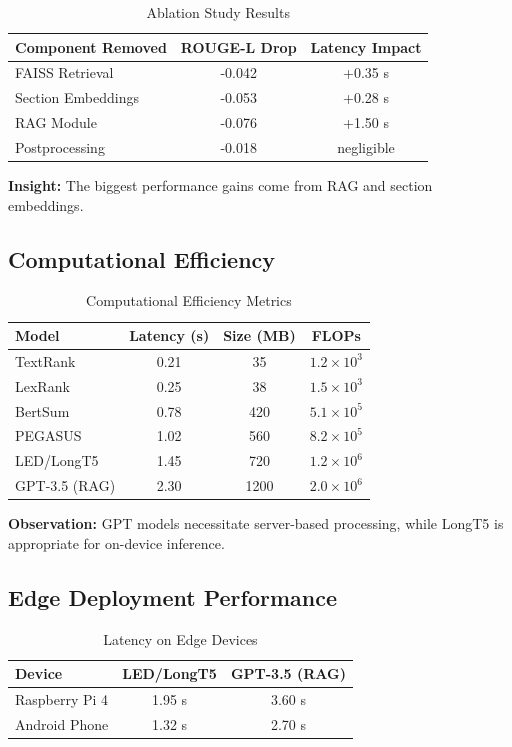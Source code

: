 \documentclass[conference]{IEEEtran}
\begin{document}
\begin{table}[h]
\centering
\caption{Ablation Study Results}
\begin{tabular}{lcc}
\hline
\textbf{Component Removed} & \textbf{ROUGE-L Drop} & \textbf{Latency Impact} \\
\hline
FAISS Retrieval & -0.042 & +0.35 s \\
Section Embeddings & -0.053 & +0.28 s \\
RAG Module & -0.076 & +1.50 s \\
Postprocessing & -0.018 & negligible \\
\hline
\end{tabular}
\end{table}

\textbf{Insight:} The biggest performance gains come from RAG and section embeddings.

\subsection{Computational Efficiency}

\begin{table}[h]
\centering
\caption{Computational Efficiency Metrics}
\begin{tabular}{lccc}
\hline
\textbf{Model} & \textbf{Latency (s)} & \textbf{Size (MB)} & \textbf{FLOPs} \\
\hline
TextRank & 0.21 & 35 & $1.2\times10^{3}$ \\
LexRank & 0.25 & 38 & $1.5\times10^{3}$ \\
BertSum & 0.78 & 420 & $5.1\times10^{5}$ \\
PEGASUS & 1.02 & 560 & $8.2\times10^{5}$ \\
LED/LongT5 & 1.45 & 720 & $1.2\times10^{6}$ \\
GPT-3.5 (RAG) & 2.30 & 1200 & $2.0\times10^{6}$ \\
\hline
\end{tabular}
\end{table}

\textbf{Observation:} GPT models necessitate server-based processing, while LongT5 is appropriate for on-device inference.

\subsection{Edge Deployment Performance}

\begin{table}[h]
\centering
\caption{Latency on Edge Devices}
\begin{tabular}{lcc}
\hline
\textbf{Device} & \textbf{LED/LongT5} & \textbf{GPT-3.5 (RAG)} \\
\hline
Raspberry Pi 4 & 1.95 s & 3.60 s \\
Android Phone & 1.32 s & 2.70 s \\
\hline
\end{tabular}
\end{table}
\end{document}
